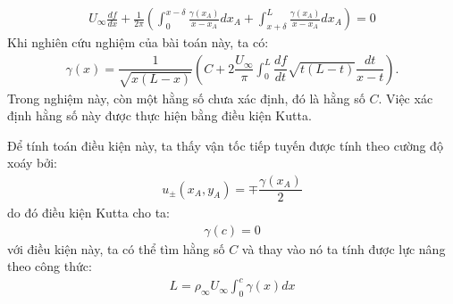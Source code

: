 \documentclass[KHI_DONG_HOC.tex]{subfiles}
\begin{document}





	\begin{align}
		{U_\infty }\frac{{df}}{{dx}} + \frac{1}{{2\pi }}\left( {\int_0^{x - \delta } {\frac{{\gamma \left( {x_A} \right)}}{{x - x_A}}dx_A}  + \int_{x + \delta }^L {\frac{{\gamma \left( {x_A} \right)}}{{x - x_A}}dx_A} } \right) = 0
	\end{align}
	Khi nghiên cứu nghiệm của bài toán này, ta có:
	\begin{align}
		\gamma(x)=\dfrac{1}{\sqrt{x(L-x)}}\left(C+2\dfrac{U_\infty}{\pi}\int_0^L{\dfrac{df}{dt}\sqrt{t(L-t)}\dfrac{dt}{x-t}}\right).
	\end{align}
	Trong nghiệm này, còn một hằng số chưa xác định, đó là hằng số $C$. Việc xác định hằng số này được thực hiện bằng điều kiện Kutta.
	
	Để tính toán điều kiện này, ta thấy vận tốc tiếp tuyến được tính theo cường độ xoáy bởi:
	\begin{align}
		u_\pm(x_A,y_A)=\mp\dfrac{\gamma(x_A)}{2}
	\end{align}
	do đó điều kiện Kutta cho ta:
	\begin{align}
		\gamma(c)=0
	\end{align}
	với điều kiện này, ta có thể tìm hằng số $C$ và thay vào nó ta tính được lực nâng theo công thức:
	\begin{align}
		L=\rho_\infty U_\infty\int_0^c\gamma(x)dx
	\end{align}
\end{document}
